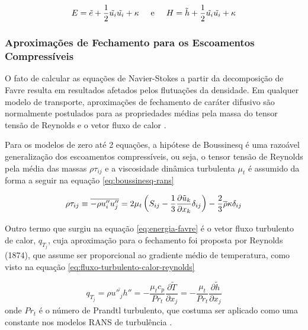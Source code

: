 \begin{equation}
	E = \Tilde{e} + \frac{1}{2}\Tilde{u_i}\Tilde{u_i} + \kappa 
	\hspace{0.5cm} 
	\text{e} 
	\hspace{0.5cm} 
	H = \Tilde{h} + \frac{1}{2}\Tilde{u_i}\Tilde{u_i} + \kappa
\end{equation} 

\subsubsection{Aproximações de Fechamento para os Escoamentos Compressíveis}

O fato de calcular as equações de Navier-Stokes a partir da decomposição de Favre resulta em resultados afetados pelos flutuações da densidade. Em qualquer modelo de transporte, aproximações de fechamento de caráter difusivo são normalmente postulados para as propriedades médias pela massa do tensor tensão de Reynolds e o vetor fluxo de calor \cite{Wilcox2006}. 

Para os modelos de zero até 2 equações, a hipótese de Boussinesq é uma razoável generalização dos escoamentos compressíveis, ou seja, o tensor tensão de Reynolds pela média das massas \(\rho\tau_{ij}\) e a viscosidade dinâmica turbulenta \(\mu_t\) é assumido da forma a seguir na equação \ref{eq:boussinesq-rans}

\begin{equation}
	\label{eq:boussinesq-rans}
	\rho\tau_{ij} \equiv \overline{-\rho u''_{i}u''_{j}} = 2\mu_t \left(S_{ij} - \frac{1}{3}\frac{\partial \Tilde{u}_k}{\partial x_k}\delta_{ij}\right) - \frac{2}{3}\overline{\rho}\kappa\delta_{ij}
\end{equation}

Outro termo que surgiu na equação \ref{eq:energia-favre} é o vetor fluxo turbulento de calor, \(q_{T_j}\), cuja aproximação para o fechamento foi proposta por Reynolds (1874), que assume ser proporcional ao gradiente médio de temperatura, como visto na equação \ref{eq:fluxo-turbulento-calor-reynolds} 

\begin{equation}
	\label{eq:fluxo-turbulento-calor-reynolds}
	q_{T_j} = \overline{\rho u''_j h''} = -\frac{\mu_t c_p}{Pr_t}\frac{\partial \tilde{T}}{\partial x_j} = -\frac{\mu_t}{Pr_t}\frac{\partial \tilde{h}}{\partial x_j}
\end{equation}
%
onde \(Pr_t\) é o número de Prandtl turbulento, que costuma ser aplicado como uma constante nos modelos RANS de turbulência \cite{Wilcox2006}.

